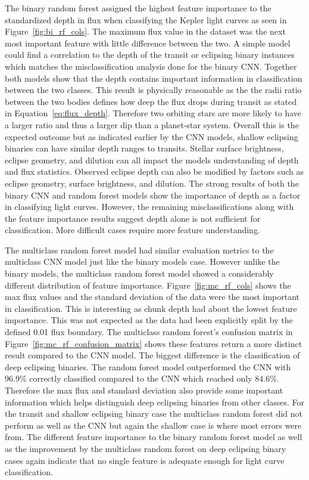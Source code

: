 The binary random forest assigned the highest feature importance to the standardized depth in flux when classifying the Kepler light curves as seen in Figure~\ref{fig:bi_rf_cols}. The maximum flux value in the dataset was the next most important feature with little difference between the two. A simple model could find a correlation to the depth of the transit or eclipsing binary instances which matches the misclassification analysis done for the binary CNN. Together both models show that the depth contains important information in classification between the two classes. This result is physically reasonable as the the radii ratio between the two bodies defines how deep the flux drops during transit as stated in Equation~\ref{eq:flux_depth}. Therefore two orbiting stars are more likely to have a larger ratio and thus a larger dip than a planet-star system. Overall this is the expected outcome but as indicated earlier by the CNN models, shallow eclipsing binaries can have similar depth ranges to transits. Stellar surface brightness, eclipse geometry, and dilution can all impact the models understanding of depth and flux statistics. Observed eclipse depth can also be modified by factors such as eclipse geometry, surface brightness, and dilution. The strong results of both the binary CNN and random forest models show the importance of depth as a factor in classifying light curves. However, the remaining misclassifications along with the feature importance results suggest depth alone is not sufficient for classification. More difficult cases require more feature understanding.

The multiclass random forest model had similar evaluation metrics to the multiclass CNN model just like the binary models case. However unlike the binary models, the multiclass random forest model showed a considerably different distribution of feature importance. Figure~\ref{fig:mc_rf_cols} shows the max flux values and the standard deviation of the data were the most important in classification. This is interesting as chunk depth had about the lowest feature importance. This was not expected as the data had been explicitly split by the defined 0.01 flux boundary. The multiclass random forest's confusion matrix in Figure~\ref{fig:mc_rf_confusion_matrix} shows these features return a more distinct result compared to the CNN model. The biggest difference is the classification of deep eclipsing binaries. The random forest model outperformed the CNN with 96.9\% correctly classified compared to the CNN which reached only 84.6\%. Therefore the max flux and standard deviation also provide some important information which helps distinguish deep eclipsing binaries from other classes. For the transit and shallow eclipsing binary case the multiclass random forest did not perform as well as the CNN but again the shallow case is where most errors were from. The different feature importance to the binary random forest model as well as the improvement by the multiclass random forest on deep eclipsing binary cases again indicate that no single feature is adequate enough for light curve classification.

